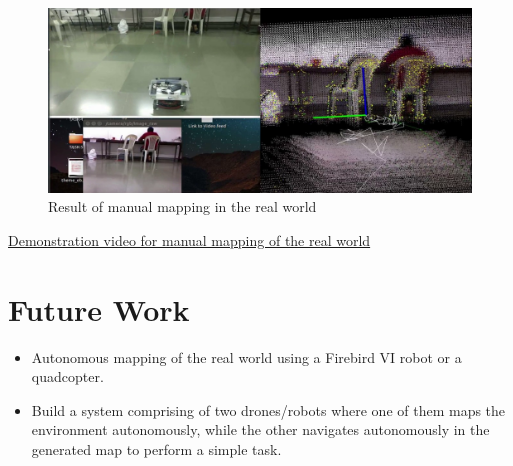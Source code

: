 \documentclass[a4paper,12pt,oneside]{book}
\begin{document}
\begin{figure}[h]
	\centering
	\includegraphics[scale=0.4]{botmap}
	\caption{Result of manual mapping in the real world}
\end{figure}

\href{https://youtu.be/IJxsbCbQITg}{Demonstration video for manual mapping of the real world}

\section{Future Work}
	\begin{itemize}
		\item Autonomous mapping of the real world using a Firebird VI robot or a quadcopter.
		\item Build a system comprising of two drones/robots where one of them maps the environment autonomously, while the other navigates autonomously in the generated map to perform a simple task.
	\end{itemize}
\end{document}
